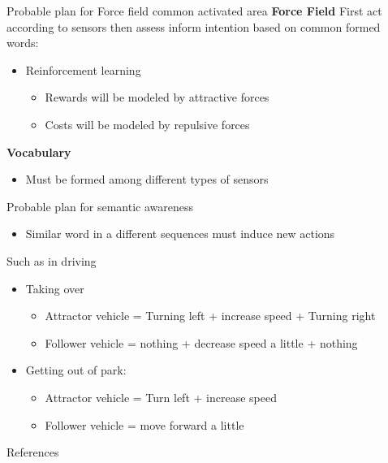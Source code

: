 \documentclass[unknownkeysallowed]{beamer}
\begin{document}
	\begin{frame}{Probable plan for Force field common activated area}
		\textbf{Force Field}
		First act according to sensors then assess inform intention based on common formed words:
		\begin{itemize}
			\item Reinforcement learning
				\begin{itemize}
					\item Rewards will be modeled by attractive forces
					\item Costs will be modeled by repulsive forces
				\end{itemize}
		\end{itemize}
		\textbf{Vocabulary}
		\begin{itemize}
			\item Must be formed among different types of sensors 
		\end{itemize}
	\end{frame}

	\begin{frame}{Probable plan for semantic awareness}
		\begin{itemize}
			\item Similar word in a different sequences must induce new actions
		\end{itemize}
		Such as in driving
		\begin{itemize}
			\item Taking over
				\begin{itemize}
					\item Attractor vehicle  = Turning left + increase speed + Turning right
					\item Follower vehicle = nothing + decrease speed a little + nothing
				\end{itemize}
			\item Getting out of park:
				\begin{itemize}
					\item Attractor vehicle = Turn left + increase speed
					\item Follower vehicle =  move forward a little
				\end{itemize}
		\end{itemize}
	\end{frame}
	
	
	\begin{frame}[allowframebreaks]{References}
		\printbibliography
	\end{frame}
\end{document}
